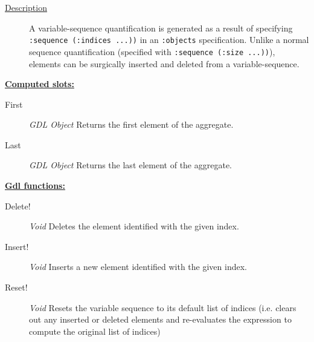 \documentclass [11pt]{book}
\begin{document}
\begin{itemize}
\begin{description}
\item [
\underline{Description}]


A variable-sequence quantification is generated as a result of specifying 
\texttt{:sequence (:indices ...))} in an \texttt{:objects} specification. Unlike a normal sequence quantification (specified
with \texttt{:sequence (:size ...))}), elements can be surgically inserted and deleted from a variable-sequence.



\end{description}








\textbf{
\underline{Computed slots:}}

\begin{description}

\item [First]
\emph{GDL Object} Returns the first element of the aggregate.


\item [Last]
\emph{GDL Object} Returns the last element of the aggregate.


\end{description}






\textbf{
\underline{Gdl functions:}}

\begin{description}

\item [Delete!]
\emph{Void} Deletes the element identified with the given index.


\item [Insert!]
\emph{Void} Inserts a new element identified with the given index.


\item [Reset!]
\emph{Void} Resets the variable sequence to its default list of indices (i.e. clears out any inserted or deleted elements and
re-evaluates the expression to compute the original list of indices)


\end{description}







\end{itemize}
\end{document}
